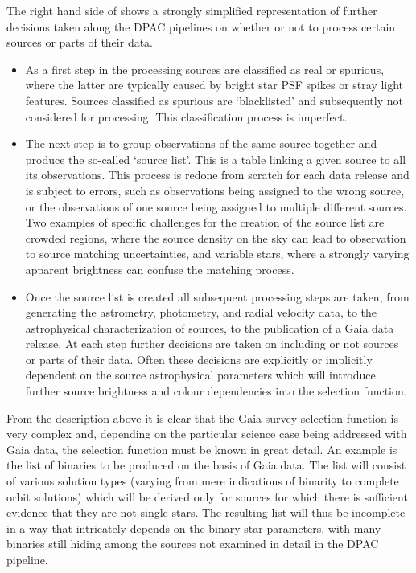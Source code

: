 The right hand side of  shows a strongly simplified representation of further decisions taken along the DPAC pipelines on whether or not to process certain sources or parts of their data.
\begin{itemize}
    \item As a first step in the processing sources are classified as real or spurious, where the latter are typically caused by bright star PSF spikes or stray light features. Sources classified as spurious are `blacklisted' and subsequently not considered for processing. This classification process is imperfect.
    \item The next step is to group observations of the same source together and produce the so-called `source list'. This is a table linking a given source to all its observations. This process is redone from scratch for each data release and is subject to errors, such as observations being assigned to the wrong source, or the observations of one source being assigned to multiple different sources. Two examples of specific challenges for the creation of the source list are crowded regions, where the source density on the sky can lead to observation to source matching uncertainties, and variable stars, where a strongly varying apparent brightness can confuse the matching process.
    \item Once the source list is created all subsequent processing steps are taken, from generating the astrometry, photometry, and radial velocity data, to the astrophysical characterization of sources, to the publication of a Gaia data release. At each step further decisions are taken on including or not sources or parts of their data. Often these decisions are explicitly or implicitly dependent on the source astrophysical parameters which will introduce further source brightness and colour dependencies into the selection function.
\end{itemize}

From the description above it is clear that the Gaia survey selection function is very complex and, depending on the particular science case being addressed with Gaia data, the selection function must be known in great detail. An example is the list of binaries to be produced on the basis of Gaia data. The list will consist of various solution types (varying from mere indications of binarity to complete orbit solutions) which will be derived only for sources for which there is sufficient evidence that they are not single stars. The resulting list will thus be incomplete in a way that intricately depends on the binary star parameters, with many binaries still hiding among the sources not examined in detail in the DPAC pipeline.

